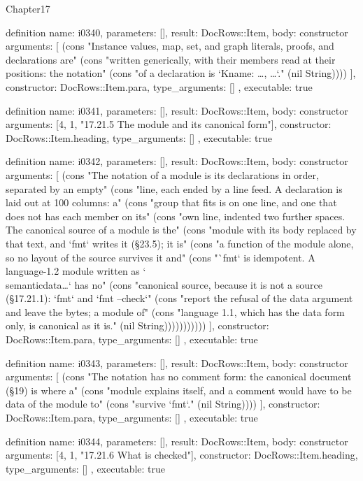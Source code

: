 \begin{lexlean}{Chapter17}
\begin{semanticmodule}
definition{
  name: i0340,
  parameters: [],
  result: DocRows::Item,
  body: constructor{
    arguments: [
      (cons "Instance values, map, set, and graph literals, proofs, and declarations are" (cons "written generically, with their members read at their positions: the notation" (cons "of a declaration is `K{name: …, …}`." (nil String))))
    ],
    constructor: DocRows::Item.para,
    type_arguments: []
  },
  executable: true
}

definition{
  name: i0341,
  parameters: [],
  result: DocRows::Item,
  body: constructor{
    arguments: [4, 1, "17.21.5 The module and its canonical form"],
    constructor: DocRows::Item.heading,
    type_arguments: []
  },
  executable: true
}

definition{
  name: i0342,
  parameters: [],
  result: DocRows::Item,
  body: constructor{
    arguments: [
      (cons "The notation of a module is its declarations in order, separated by an empty" (cons "line, each ended by a line feed. A declaration is laid out at 100 columns: a" (cons "group that fits is on one line, and one that does not has each member on its" (cons "own line, indented two further spaces. The canonical source of a module is the" (cons "module with its body replaced by that text, and `fmt` writes it (§23.5); it is" (cons "a function of the module alone, so no layout of the source survives it and" (cons "`fmt` is idempotent. A language-1.2 module written as `\\semanticdata{…}` has no" (cons "canonical source, because it is not a source (§17.21.1): `fmt` and `fmt --check`" (cons "report the refusal of the data argument and leave the bytes; a module of" (cons "language 1.1, which has the data form only, is canonical as it is." (nil String)))))))))))
    ],
    constructor: DocRows::Item.para,
    type_arguments: []
  },
  executable: true
}

definition{
  name: i0343,
  parameters: [],
  result: DocRows::Item,
  body: constructor{
    arguments: [
      (cons "The notation has no comment form: the canonical document (§19) is where a" (cons "module explains itself, and a comment would have to be data of the module to" (cons "survive `fmt`." (nil String))))
    ],
    constructor: DocRows::Item.para,
    type_arguments: []
  },
  executable: true
}

definition{
  name: i0344,
  parameters: [],
  result: DocRows::Item,
  body: constructor{
    arguments: [4, 1, "17.21.6 What is checked"],
    constructor: DocRows::Item.heading,
    type_arguments: []
  },
  executable: true
}


\end{semanticmodule}
\end{lexlean}
